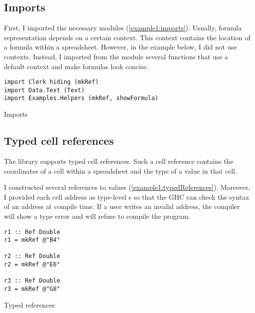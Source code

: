 
\subsection{Imports}

First, I imported the necessary modules (\cref{example1:imports}).
Usually, formula representation depends on a certain context.
This context contains the location of a formula within a spreadsheet.
However, in the example below, I did not use contexts.
Instead, I imported from the module  several functions that use a default context and make formulas look concise.

\begin{listing}[!h]
  \begin{verbatim}
import Clerk hiding (mkRef)
import Data.Text (Text)
import Examples.Helpers (mkRef, showFormula)
\end{verbatim}
  \caption{Imports}
  \label{example1:imports}
\end{listing}

\subsection{Typed cell references}

The \clerk library supports typed cell references. Such a cell reference contains the coordinates of a cell within a spreadsheet and the type of a value in that cell.


I constructed several references to  values (\cref{example1:typedReferences}). Moreover, I provided each cell address as type-level s so that the GHC can check the syntax of an address at compile time. If a user writes an invalid address, the compiler will show a type error and will refuse to compile the program.

\begin{listing}[!h]
  \begin{verbatim}
r1 :: Ref Double
r1 = mkRef @"B4"

r2 :: Ref Double
r2 = mkRef @"E6"

r3 :: Ref Double
r3 = mkRef @"G8"
\end{verbatim}
  \caption{Typed references}
  \label{example1:typedReferences}
\end{listing}

\newpage

